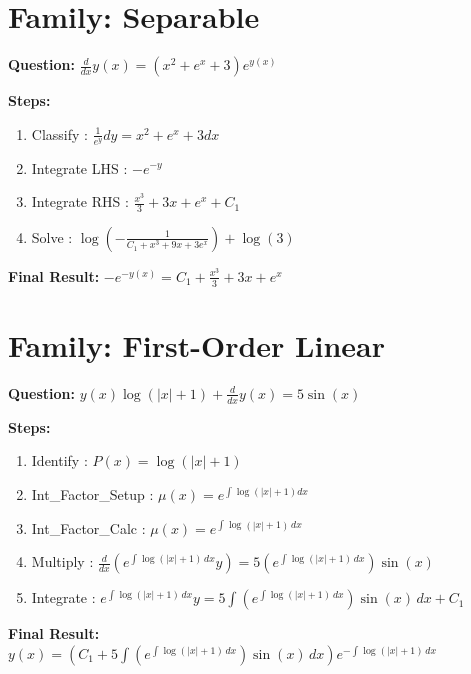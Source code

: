 \documentclass{article}
\begin{document}
\section*{Family: Separable}
\textbf{Question:} $\frac{d}{d x} y{\left(x \right)} = \left(x^{2} + e^{x} + 3\right) e^{y{\left(x \right)}}$

\textbf{Steps:}
\begin{enumerate}
\item Classify :  $\frac{1}{e^{y}} dy = x^{2} + e^{x} + 3 dx$
\item Integrate LHS :  $- e^{- y}$
\item Integrate RHS :  $\frac{x^{3}}{3} + 3 x + e^{x} + C_1$
\item Solve :  $\log{\left(- \frac{1}{C_{1} + x^{3} + 9 x + 3 e^{x}} \right)} + \log{\left(3 \right)}$
\end{enumerate}
\textbf{Final Result:} $- e^{- y{\left(x \right)}} = C_{1} + \frac{x^{3}}{3} + 3 x + e^{x}$

\section*{Family: First-Order Linear}
\textbf{Question:} $y{\left(x \right)} \log{\left(\left|{x}\right| + 1 \right)} + \frac{d}{d x} y{\left(x \right)} = 5 \sin{\left(x \right)}$

\textbf{Steps:}
\begin{enumerate}
\item Identify :  $P(x) = \log{\left(\left|{x}\right| + 1 \right)}$
\item Int_Factor_Setup :  $\mu(x) = e^{\int \log{\left(\left|{x}\right| + 1 \right)} dx}$
\item Int_Factor_Calc :  $\mu(x) = e^{\int \log{\left(\left|{x}\right| + 1 \right)}\, dx}$
\item Multiply :  $\frac{d}{dx}(e^{\int \log{\left(\left|{x}\right| + 1 \right)}\, dx}y) = 5 \left(e^{\int \log{\left(\left|{x}\right| + 1 \right)}\, dx}\right) \sin{\left(x \right)}$
\item Integrate :  $e^{\int \log{\left(\left|{x}\right| + 1 \right)}\, dx}y = 5 \int \left(e^{\int \log{\left(\left|{x}\right| + 1 \right)}\, dx}\right) \sin{\left(x \right)}\, dx + C_1$
\end{enumerate}
\textbf{Final Result:} $y{\left(x \right)} = \left(C_{1} + 5 \int \left(e^{\int \log{\left(\left|{x}\right| + 1 \right)}\, dx}\right) \sin{\left(x \right)}\, dx\right) e^{- \int \log{\left(\left|{x}\right| + 1 \right)}\, dx}$
\end{document}

